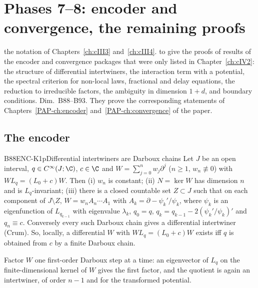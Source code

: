 \chapter[Encoder and convergence: more proofs]{Phases 7--8: encoder and convergence, the remaining proofs}\label{ch:cIV6}
\chapterbrief
{the notation of Chapters~\ref{ch:cIII3} and~\ref{ch:cIII4}.}
{to give the proofs of results of the encoder and convergence packages that were only listed in Chapter~\ref{ch:cIV2}: the structure of differential intertwiners, the interaction term with a potential, the spectral criterion for non-local laws, fractional and delay equations, the reduction to irreducible factors, the ambiguity in dimension $1+d$, and boundary conditions.}
{Dim.~B88--B93. They prove the corresponding statements of Chapters~\ref{PAP-ch:encoder} and~\ref{PAP-ch:convergence} of the paper.}

\section{The encoder}

\begin{dimcard}{B88}{ENC-K1p}{Differential intertwiners are Darboux chains}{\proved}{}
Let $J$ be an open interval, $q\in C^\infty(J;\C)$, $c\in\C$ and $W=\sum_{j=0}^nw_j\partial^j$ ($n\ge1$, $w_n\not\equiv0$) with $WL_q=(L_0+c)W$. Then (i) $w_n$ is constant; (ii) $N=\ker W$ has dimension $n$ and is $L_q$-invariant; (iii) there is a closed countable set $Z\subset J$ such that on each component of $J\setminus Z$, $W=w_nA_n\cdots A_1$ with $A_k=\partial-\psi_k'/\psi_k$, where $\psi_k$ is an eigenfunction of $L_{q_{k-1}}$ with eigenvalue $\lambda_k$, $q_0=q$, $q_k=q_{k-1}-2(\psi_k'/\psi_k)'$ and $q_n\equiv c$. Conversely every such Darboux chain gives a differential intertwiner (Crum). So, locally, a differential $W$ with $WL_q=(L_0+c)W$ exists iff $q$ is obtained from $c$ by a finite Darboux chain.
\end{dimcard}

\begin{proofidea}
Factor $W$ one first-order Darboux step at a time: an eigenvector of $L_q$ on the finite-dimensional kernel of $W$ gives the first factor, and the quotient is again an intertwiner, of order $n-1$ and for the transformed potential.
\end{proofidea}


